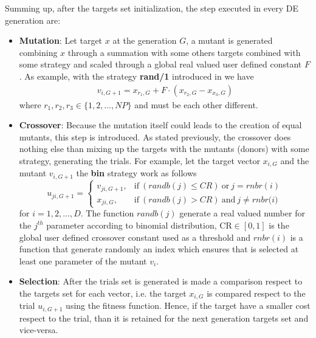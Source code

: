 Summing up, after the targets set initialization, the step executed in every DE generation are:
\begin{itemize}
	\item{\textbf{Mutation}: Let target $x$ at the generation $G$, a mutant is generated combining $x$ through a summation with some others targets combined with some strategy and scaled through a global real valued user defined constant $F$. As example, with the strategy \textbf{rand/1} introduced in \cite{DESEHGOCS:1997} we have
	\begin{align}
		v_{i,G+1} = x_{r_{1},G} + F\cdot(x_{r_{2},G} - x_{x_{3},G})
	\end{align}
	where $r_{1},r_{2},r_{3} \in \{1,2,\dots,NP\}$ and must be each other different.}
	\item{\textbf{Crossover}: Because the mutation itself could leads to the creation of equal mutants, this step is introduced. As stated previously, the crossover does nothing else than mixing up the targets with the mutants (donors) with some strategy, generating the trials. For example, let the target vector $x_{i,G}$ and the mutant $v_{i,G+1}$ the \textbf{bin} strategy work as follows
	\begin{equation}
		u_{ji, G+1} = \begin{cases}
			v_{ji,G+1}, & \textrm{if}\ (\textit{randb}(j) \leq \textit{CR})\ \textrm{or}\ j=\textit{rnbr}(i)\\
			x_{ji,G}, & \textrm{if}\ (\textit{randb}(j) > \textit{CR})\ \textrm{and}\ j\neq\textit{rnbr(i)}
		\end{cases}
	\end{equation}
	for $i=1,2,\dots,D$. The function $\textit{randb}(j)$ generate a real valued number for the $j^{th}$ parameter according to binomial distribution, $\textrm{CR}\in[0,1]$ is the global user defined crossover constant used as a threshold and $\textit{rnbr}(i)$ is a function that generate randomly an index which ensures that is selected at least one parameter of the mutant $v_{i}$.}
	\item{\textbf{Selection}: After the trials set is generated is made a comparison respect to the targets set for each vector, i.e. the target $x_{i, G}$ is compared respect to the trial $u_{i,G+1}$ using the fitness function. Hence, if the target have a smaller cost respect to the trial, than it is retained for the next generation targets set and vice-versa.}
\end{itemize}


